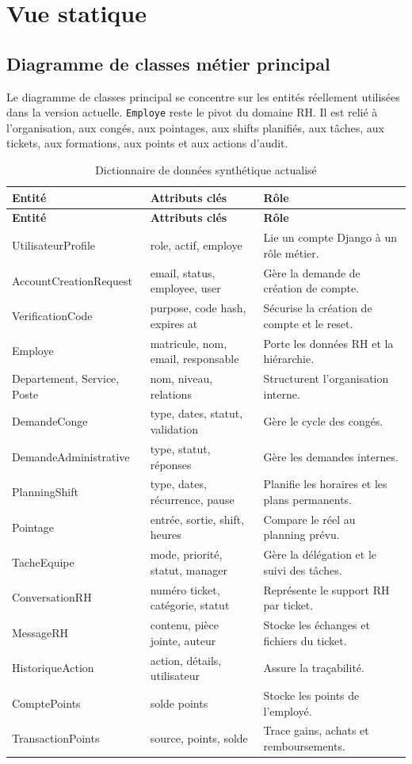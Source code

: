 \documentclass[12pt,a4paper]{report}
\begin{document}
\section{Vue statique}
\subsection{Diagramme de classes métier principal}
Le diagramme de classes principal se concentre sur les entités réellement utilisées dans la version actuelle. \texttt{Employe} reste le pivot du domaine RH. Il est relié à l'organisation, aux congés, aux pointages, aux shifts planifiés, aux tâches, aux tickets, aux formations, aux points et aux actions d'audit.

\begin{longtable}{p{4cm}p{5cm}p{5cm}}
\caption{Dictionnaire de données synthétique actualisé}\label{tab:dictionnaire}\\
\toprule
\textbf{Entité} & \textbf{Attributs clés} & \textbf{Rôle}\\
\midrule
\endfirsthead
\toprule
\textbf{Entité} & \textbf{Attributs clés} & \textbf{Rôle}\\
\midrule
\endhead
UtilisateurProfile & role, actif, employe & Lie un compte Django à un rôle métier.\\
AccountCreation\newline Request & email, status, employee, user & Gère la demande de création de compte.\\
VerificationCode & purpose, code hash, expires at & Sécurise la création de compte et le reset.\\
Employe & matricule, nom, email, responsable & Porte les données RH et la hiérarchie.\\
Departement, Service, Poste & nom, niveau, relations & Structurent l'organisation interne.\\
DemandeConge & type, dates, statut, validation & Gère le cycle des congés.\\
Demande\newline Administrative & type, statut, réponses & Gère les demandes internes.\\
PlanningShift & type, dates, récurrence, pause & Planifie les horaires et les plans permanents.\\
Pointage & entrée, sortie, shift, heures & Compare le réel au planning prévu.\\
TacheEquipe & mode, priorité, statut, manager & Gère la délégation et le suivi des tâches.\\
ConversationRH & numéro ticket, catégorie, statut & Représente le support RH par ticket.\\
MessageRH & contenu, pièce jointe, auteur & Stocke les échanges et fichiers du ticket.\\
HistoriqueAction & action, détails, utilisateur & Assure la traçabilité.\\
ComptePoints & solde points & Stocke les points de l'employé.\\
TransactionPoints & source, points, solde & Trace gains, achats et remboursements.\\
\bottomrule
\end{longtable}
\end{document}
